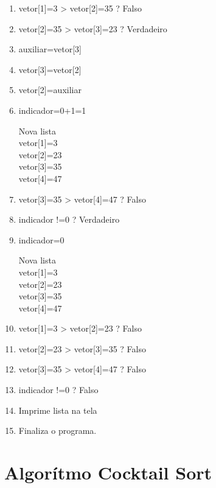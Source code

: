 \documentclass[11pts]{book}
\begin{document}
\begin{enumerate}
\item vetor[1]=3 > vetor[2]=35 ? Falso

\item vetor[2]=35 > vetor[3]=23 ? Verdadeiro

\item auxiliar=vetor[3]

\item vetor[3]=vetor[2]

\item vetor[2]=auxiliar

\item indicador=0+1=1

 Nova lista \\
vetor[1]=3 \\
vetor[2]=23 \\
vetor[3]=35\\
vetor[4]=47 \\

\item vetor[3]=35 > vetor[4]=47 ? Falso 

\item indicador !=0 ?  Verdadeiro  

\item indicador=0

  Nova lista \\
vetor[1]=3 \\
vetor[2]=23 \\
vetor[3]=35\\
vetor[4]=47 \\

\item vetor[1]=3 > vetor[2]=23 ? Falso

\item vetor[2]=23 > vetor[3]=35 ? Falso

\item vetor[3]=35 > vetor[4]=47 ? Falso

\item indicador !=0 ?  Falso 

\item Imprime lista  na tela 

\item Finaliza o programa.

\end{enumerate}






\section{Algorítmo Cocktail Sort}
\end{document}
